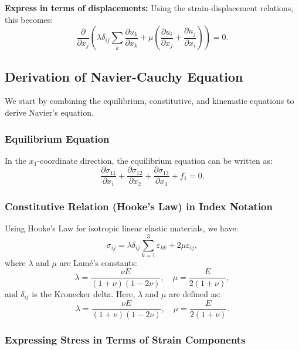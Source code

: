 \documentclass[fleqn,10pt]{olplainarticle}
\begin{document}
\textbf{Express in terms of displacements:} Using the strain-displacement relations, this becomes:
\begin{equation}
\frac{\partial}{\partial x_j} \left( \lambda \delta_{ij} \sum_{k} \frac{\partial u_k}{\partial x_k} + \mu \left( \frac{\partial u_i}{\partial x_j} + \frac{\partial u_j}{\partial x_i} \right) \right) = 0.
\end{equation}


\subsection{Derivation of Navier-Cauchy Equation}

We start by combining the equilibrium, constitutive, and kinematic equations to derive Navier's equation.

\subsubsection{Equilibrium Equation}

In the \(x_1\)-coordinate direction, the equilibrium equation can be written as:
\[
\frac{\partial \sigma_{11}}{\partial x_1} + \frac{\partial \sigma_{12}}{\partial x_2} + \frac{\partial \sigma_{13}}{\partial x_3} + f_1 = 0.
\]

\subsubsection{Constitutive Relation (Hooke's Law) in Index Notation}

Using Hooke's Law for isotropic linear elastic materials, we have:
\[
\sigma_{ij} = \lambda \delta_{ij} \sum_{k=1}^3 \varepsilon_{kk} + 2\mu \varepsilon_{ij},
\]
where \(\lambda\) and \(\mu\) are Lamé's constants:
\[
\lambda = \frac{\nu E}{(1 + \nu)(1 - 2 \nu)}, \quad \mu = \frac{E}{2(1 + \nu)},
\]
and \(\delta_{ij}\) is the Kronecker delta. Here, \(\lambda\) and \(\mu\) are defined as:
\[
\lambda = \frac{\nu E}{(1 + \nu)(1 - 2\nu)}, \quad \mu = \frac{E}{2(1 + \nu)}.
\]

\subsubsection{Expressing Stress in Terms of Strain Components}
\end{document}
